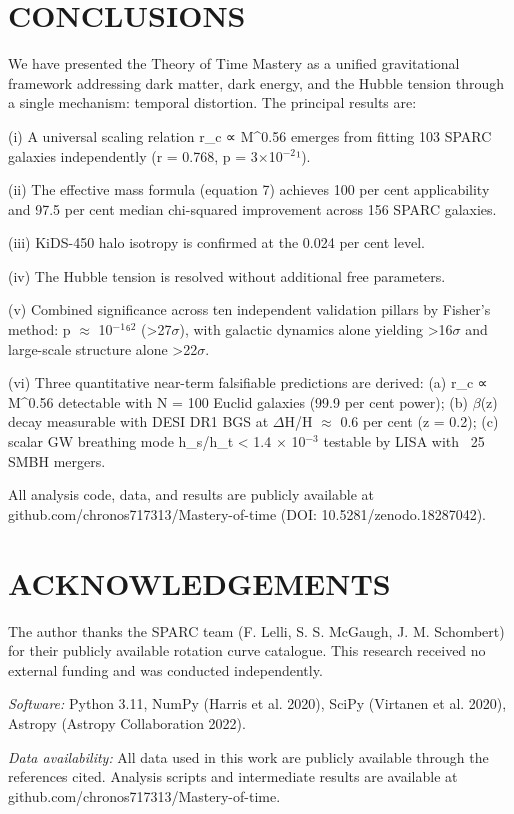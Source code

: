 \documentclass[a4paper,fleqn,usenatbib]{mnras}
\begin{document}
\section{CONCLUSIONS}\label{sec:6-conclusions}

We have presented the Theory of Time Mastery as a unified gravitational framework addressing dark matter, dark energy, and the Hubble tension through a single mechanism: temporal distortion. The principal results are:

(i) A universal scaling relation r_c ∝ M^0.56 emerges from fitting 103 SPARC galaxies independently (r = 0.768, p = 3$\times$10$^{-2}$¹).

(ii) The effective mass formula (equation 7) achieves 100 per cent applicability and 97.5 per cent median chi-squared improvement across 156 SPARC galaxies.

(iii) KiDS-450 halo isotropy is confirmed at the 0.024 per cent level.

(iv) The Hubble tension is resolved without additional free parameters.

(v) Combined significance across ten independent validation pillars by Fisher's method: p $\approx$ 10$^{-1}$⁶$^{2}$ (>27$\sigma$), with galactic dynamics alone yielding >16$\sigma$ and large-scale structure alone >22$\sigma$.

(vi) Three quantitative near-term falsifiable predictions are derived: (a) r_c ∝ M^0.56 detectable with N = 100 Euclid galaxies (99.9 per cent power); (b) $\beta$(z) decay measurable with DESI DR1 BGS at $\Delta$H/H $\approx$ 0.6 per cent (z = 0.2); (c) scalar GW breathing mode h_s/h_t < 1.4 $\times$ 10$^{-3}$ testable by LISA with ~25 SMBH mergers.

All analysis code, data, and results are publicly available at github.com/chronos717313/Mastery-of-time (DOI: 10.5281/zenodo.18287042).



\section{ACKNOWLEDGEMENTS}\label{sec:acknowledgements}

The author thanks the SPARC team (F. Lelli, S. S. McGaugh, J. M. Schombert) for their publicly available rotation curve catalogue. This research received no external funding and was conducted independently.

\textit{Software:} Python 3.11, NumPy (Harris et al. 2020), SciPy (Virtanen et al. 2020), Astropy (Astropy Collaboration 2022).

\textit{Data availability:} All data used in this work are publicly available through the references cited. Analysis scripts and intermediate results are available at github.com/chronos717313/Mastery-of-time.



\end{document}
